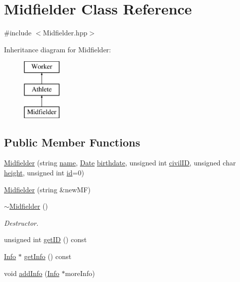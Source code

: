 \hypertarget{class_midfielder}{}\section{Midfielder Class Reference}
\label{class_midfielder}


{\ttfamily \#include $<$Midfielder.\+hpp$>$}

Inheritance diagram for Midfielder\+:\begin{figure}[H]
\begin{center}
\leavevmode
\includegraphics[height=3.000000cm]{class_midfielder}
\end{center}
\end{figure}
\subsection*{Public Member Functions}
\begin{DoxyCompactItemize}
\item 
\hyperlink{class_midfielder_a267913d73597a780ad523d49aadea2f0}{Midfielder} (string \hyperlink{class_worker_a66cf57341253a31e418cf8abad59ffb1}{name}, \hyperlink{class_date}{Date} \hyperlink{class_worker_a3c1845f40a084b471750a787a87614dd}{birthdate}, unsigned int \hyperlink{class_worker_adfafba55f967994f4595bd914bbba127}{civil\+ID}, unsigned char \hyperlink{class_athlete_a80a64bb1d5c943aaa7ca152d596d9914}{height}, unsigned int \hyperlink{class_worker_afc39287cd510977cfe7697ed2c86b2ca}{id}=0)
\item 
\hyperlink{class_midfielder_abab63a71a619509011b23eb3e11e099b}{Midfielder} (string \&new\+MF)
\item 
\hyperlink{class_midfielder_ae0d6c23126b9c08ea3c3a58222d4118f}{$\sim$\+Midfielder} ()
\begin{DoxyCompactList}\small\item\em Destructor. \end{DoxyCompactList}\item 
unsigned int \hyperlink{class_midfielder_ac55e51de4a6544c30ef2471b6c160d2b}{get\+ID} () const
\item 
\hyperlink{class_info}{Info} $\ast$ \hyperlink{class_midfielder_a18c2c163951dd942685950ac562f3b24}{get\+Info} () const
\item 
void \hyperlink{class_midfielder_aca69e728b57110b3f34de94556465c0a}{add\+Info} (\hyperlink{class_info}{Info} $\ast$more\+Info)
\end{DoxyCompactItemize}
